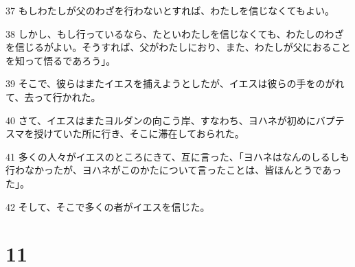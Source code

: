 \par 37 もしわたしが父のわざを行わないとすれば、わたしを信じなくてもよい。
\par 38 しかし、もし行っているなら、たといわたしを信じなくても、わたしのわざを信じるがよい。そうすれば、父がわたしにおり、また、わたしが父におることを知って悟るであろう」。
\par 39 そこで、彼らはまたイエスを捕えようとしたが、イエスは彼らの手をのがれて、去って行かれた。
\par 40 さて、イエスはまたヨルダンの向こう岸、すなわち、ヨハネが初めにバプテスマを授けていた所に行き、そこに滞在しておられた。
\par 41 多くの人々がイエスのところにきて、互に言った、「ヨハネはなんのしるしも行わなかったが、ヨハネがこのかたについて言ったことは、皆ほんとうであった」。
\par 42 そして、そこで多くの者がイエスを信じた。

\chapter{11}

